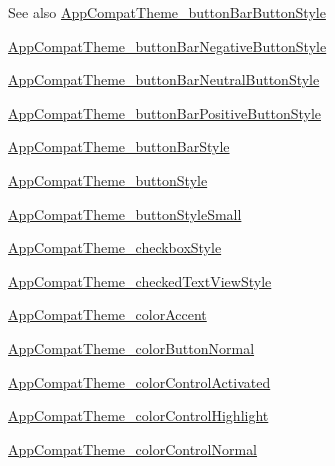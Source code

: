 \begin{DoxySeeAlso}{See also}
\hyperlink{classandroid_1_1support_1_1v7_1_1cardview_1_1R_1_1styleable_afd2644581cb07d6cd4ed27a053bf6525}{App\+Compat\+Theme\+\_\+button\+Bar\+Button\+Style} 

\hyperlink{classandroid_1_1support_1_1v7_1_1cardview_1_1R_1_1styleable_a3f0d3655b3dc02d0f7f8bac6422802ad}{App\+Compat\+Theme\+\_\+button\+Bar\+Negative\+Button\+Style} 

\hyperlink{classandroid_1_1support_1_1v7_1_1cardview_1_1R_1_1styleable_afc6ef0b8097f2e788fe27aed74360c29}{App\+Compat\+Theme\+\_\+button\+Bar\+Neutral\+Button\+Style} 

\hyperlink{classandroid_1_1support_1_1v7_1_1cardview_1_1R_1_1styleable_abfba42dac502deb993340e486ec71e30}{App\+Compat\+Theme\+\_\+button\+Bar\+Positive\+Button\+Style} 

\hyperlink{classandroid_1_1support_1_1v7_1_1cardview_1_1R_1_1styleable_a79edaebda634ee0aecb95bc0b4d88a2b}{App\+Compat\+Theme\+\_\+button\+Bar\+Style} 

\hyperlink{classandroid_1_1support_1_1v7_1_1cardview_1_1R_1_1styleable_a604ddffad2b433e9cf1cfb3aa9f82a43}{App\+Compat\+Theme\+\_\+button\+Style} 

\hyperlink{classandroid_1_1support_1_1v7_1_1cardview_1_1R_1_1styleable_a575b1d9c7fa1adee560df29f9326b54b}{App\+Compat\+Theme\+\_\+button\+Style\+Small} 

\hyperlink{classandroid_1_1support_1_1v7_1_1cardview_1_1R_1_1styleable_a1297109594ea429301e0fdfe894a1d4a}{App\+Compat\+Theme\+\_\+checkbox\+Style} 

\hyperlink{classandroid_1_1support_1_1v7_1_1cardview_1_1R_1_1styleable_aaefec504d42232e1b60c6846dbcb882f}{App\+Compat\+Theme\+\_\+checked\+Text\+View\+Style} 

\hyperlink{classandroid_1_1support_1_1v7_1_1cardview_1_1R_1_1styleable_a8b1986b83a7cb120ab848ae271cb90c8}{App\+Compat\+Theme\+\_\+color\+Accent} 

\hyperlink{classandroid_1_1support_1_1v7_1_1cardview_1_1R_1_1styleable_ac1be9238d1481c26c4f89271a750fce2}{App\+Compat\+Theme\+\_\+color\+Button\+Normal} 

\hyperlink{classandroid_1_1support_1_1v7_1_1cardview_1_1R_1_1styleable_acb93386ddcf1e452debdf2acf6cb2f17}{App\+Compat\+Theme\+\_\+color\+Control\+Activated} 

\hyperlink{classandroid_1_1support_1_1v7_1_1cardview_1_1R_1_1styleable_a49a7aa79b96c0ee6b0ea6d734fb2c0c2}{App\+Compat\+Theme\+\_\+color\+Control\+Highlight} 

\hyperlink{classandroid_1_1support_1_1v7_1_1cardview_1_1R_1_1styleable_a4c2e0c570b5982613b8cebb46cb6626a}{App\+Compat\+Theme\+\_\+color\+Control\+Normal} 


\end{DoxySeeAlso}
